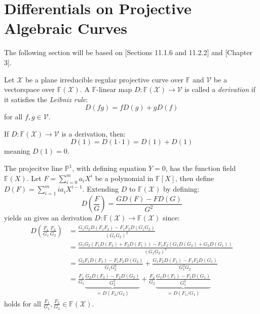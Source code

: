 \section{Differentials on Projective Algebraic Curves}%
The following section will be based on \cite{CCC_with_CA}[Sections 11.1.6 and 11.2.2] and \cite{AG_codes_and_applications}[Chapter 3].

\begin{definition}
  Let $\mathcal{X}$ be a plane irreducible regular projective curve over $\mathbb{F}$ and $\mathcal{V}$ be a vectorspace over $\mathbb{F}(\mathcal{X})$. A $\mathbb{F}$-linear map $D: \mathbb{F}(\mathcal{X}) \to \mathcal{V}$ is called a \textit{derivation} if it satisfies the \textit{Leibniz rule}:
  \begin{equation*}
    D(fg) = fD(g) + gD(f)
  \end{equation*}
  for all $f, g \in \mathcal{V}$.
\end{definition}
\begin{remark}\label{rem:derivation_at_1_is_0}
  If $D: \mathbb{F}(\mathcal{X}) \to \mathcal{V}$ is a derivation, then:
  \begin{equation*}
    D(1) = D(1 \cdot 1) = D(1) + D(1)
  \end{equation*}
  meaning $D(1) = 0$.
\end{remark}
\begin{example}
  The projecitve line $\mathbb{P}^1$, with defining equation $Y = 0$, has the function field $\mathbb{F}(X)$. Let $F = \sum_{i = 0}^{m} a_i X^i$ be a polynomial in $\mathbb{F}[X]$, then define $D(F) = \sum_{i = 1}^m i a_i X^{i - 1}$. Extending $D$ to $\mathbb{F}(\mathcal{X})$ by defining:
  \begin{equation*}
    D \left(\frac{F}{G}\right) = \frac{G D(F) - F D(G)}{G^{2}} %
  \end{equation*}
  yields an gives an derivation $D: \mathbb{F}(\mathcal{X}) \to \mathbb{F}(\mathcal{X})$ since:
  \begin{align*}
    D \left(\frac{F_{1}}{G_{1}} \frac{F_{2}}{G_{2}}\right) &= \frac{G_1G_2 D(F_1F_2) - F_1F_2 D(G_1G_2)}{(G_1G_2)^{2}}\\ &= \frac{G_1G_2 (F_1D(F_2) + F_2D(F_1)) - F_1F_2 (G_1 D(G_2) + G_2 D(G_1))}{(G_1G_2)^{2}} \\ %
                                                           &= \frac{G_2 F_1 D(F_2) - F_1F_2 D(G_2)}{G_{1}G_2^2} + \frac{G_{1} F_2 D(F_1) - F_1F_2D(G_1)}{G_1^{2}G_{2}} \\
    &= \frac{F_1}{G_1} \underset{=D \left(F_2 / G_2\right)}{\underbrace{\frac{G_2D(F_2) - F_2D(G_2)}{G_2^2}}} + \frac{F_{2}}{G_{2}} \underset{=D \left(F_1 / G_1\right)}{\underbrace{\frac{G_1D(F_1) - F_1D(G_1)}{G_1^{2}}}}
  \end{align*}
  holds for all $\frac{F_{1}}{G_{1}}, \frac{F_{2}}{G_{2}} \in \mathbb{F}(\mathcal{X})$.
\end{example}

